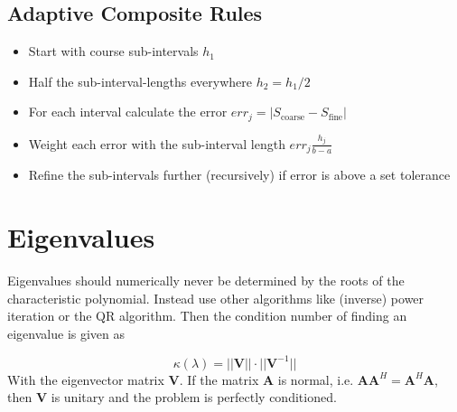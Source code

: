 \documentclass[
    a4paper,
    11pt
]{article}
\begin{document}
\subsection{Adaptive Composite Rules}

\begin{itemize}
    \item Start with course sub-intervals $h_1$
    \item Half the sub-interval-lengths everywhere $h_2=h_1/2$
    \item For each interval calculate the error $err_j = |S_{\text{coarse}} -
        S_{\text{fine}}|$
    \item Weight each error with the sub-interval length $err_j \frac{h_j}{b-a}$
    \item Refine the sub-intervals further (recursively) if error is above a set
        tolerance
\end{itemize}



\section{Eigenvalues}

Eigenvalues should numerically never be determined by the roots of the
characteristic polynomial. Instead use other algorithms like (inverse) power
iteration or the QR algorithm. Then the condition number of finding an
eigenvalue is given as

\begin{equation}
    \kappa(\lambda) = ||\mathbf{V}||\cdot||\mathbf{V}^{-1}||
\end{equation}
With the eigenvector matrix $\mathbf{V}$. If the matrix $\mathbf{A}$ is normal,
i.e. $\mathbf{AA}^H = \mathbf{A}^H \mathbf{A}$, then $\mathbf{V}$ is unitary and
the problem is perfectly conditioned.
\end{document}
